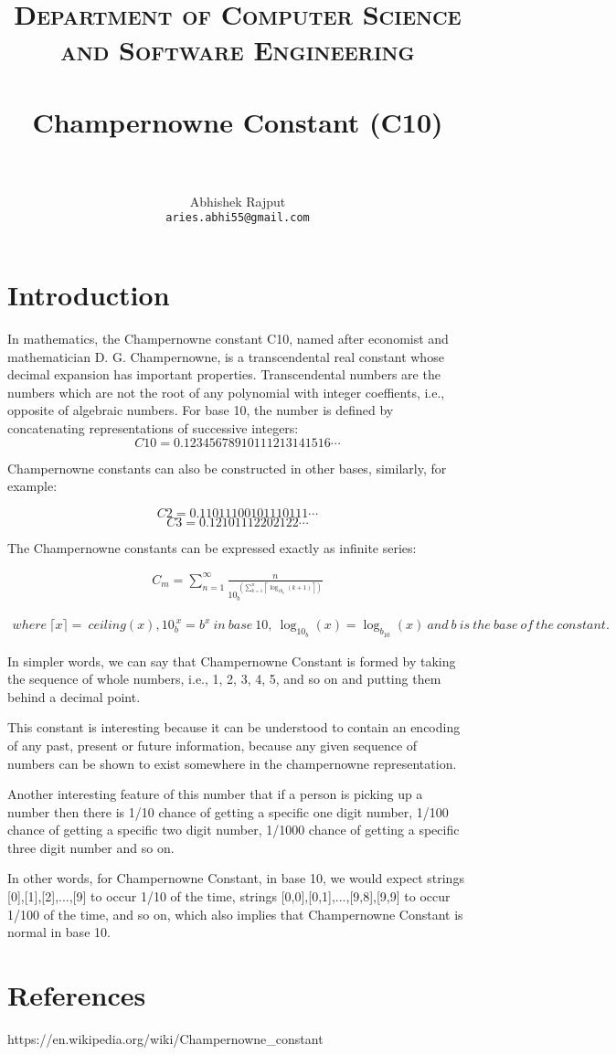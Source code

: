 \documentclass[paper=a4, fontsize=11pt]{scrartcl}
\title{
		\usefont{OT1}{bch}{b}{n}
		\normalfont \normalsize \textsc{Department of Computer Science and Software Engineering } \\ [25pt]
		\horrule{0.5pt} \\[0.4cm]
		\huge Champernowne Constant (C10) \\
		\horrule{2pt} \\[0.5cm]
}
\author{Abhishek Rajput\\ \texttt{aries.abhi55@gmail.com}} %
\date{\displaydate{date}}
\numberwithin{equation}{section}		%
\numberwithin{figure}{section}			%
\numberwithin{table}{section}				%
\begin{document}
\maketitle
\section*{Introduction}
In mathematics, the Champernowne constant C10, named after economist and mathematician D. G. Champernowne, is a transcendental real constant whose decimal expansion has important properties.\newline
Transcendental numbers are the numbers which are not the root of any polynomial with integer coeffients, i.e., opposite of algebraic numbers.\newline
For base 10, the number is defined by concatenating representations of successive integers:
\[ C10 = 0.12345678910111213141516\cdots \]  

Champernowne constants can also be constructed in other bases, similarly, for example:

\[ C2 = 0.11011100101110111\cdots \]
\[ C3 = 0.12101112202122\cdots \]

The Champernowne constants can be expressed exactly as infinite series:

\begin{align*}
{\displaystyle C_{m}=\sum _{n=1}^{\infty }{\frac {n}{10_{b}^{~\left(\sum \limits _{k=1}^{n}\left\lceil \log _{10_{b}}(k+1)\right\rceil \right)}}}}
\end{align*}

\begin{align*}
where\ {\displaystyle \lceil {x}\rceil =} \ ceiling(x), {\displaystyle 10_{b}^{~x}=b^{x}}\ in\ base\ 10,\ {\displaystyle \log _{10_{b}}(x)=\log _{b_{10}}(x)} \ and\  b\ is\ the\ base\ of \ the \ constant.
\end{align*}

\begin{flushleft}
In simpler words, we can say that Champernowne Constant is formed by taking the sequence of whole numbers, i.e., 1, 2, 3, 4, 5, and so on and putting them behind a decimal point.\newline

This constant is interesting because it can be understood to contain an encoding of any past, present or future information, because any given sequence of numbers can be shown to exist somewhere in the champernowne representation.\newline

Another interesting feature of this number that if a person is picking up a number then there is 1/10 chance of getting a specific one digit number, 1/100 chance of getting a specific two digit number, 1/1000 chance of getting a specific three digit number and so on.\newline

In other words, for Champernowne Constant, in base 10, we would expect strings [0],[1],[2],...,[9] to occur 1/10 of the time, strings [0,0],[0,1],...,[9,8],[9,9] to occur 1/100 of the time, and so on, which also implies that Champernowne Constant is normal in base 10.
\end{flushleft}

\section*{References}
https://en.wikipedia.org/wiki/Champernowne\_constant
\end{document}
